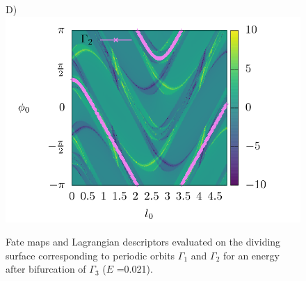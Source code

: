 \documentclass[10pt,aps,onecolumn,superscriptaddress]{revtex4-2}
\begin{document}
\begin{figure}[htbp]
	D)\includegraphics[scale=0.35]{ld_action_ds_gamma2_E_0021.png}
	\caption{ Fate maps and Lagrangian descriptors evaluated on the dividing surface corresponding to periodic orbits $\Gamma_1$ and $\Gamma_2$ for an energy after bifurcation of $\Gamma_3$  ($E$ =0.021). }
	\label{fig:ld_fm_ds_E_0021}
\end{figure}
\end{document}
